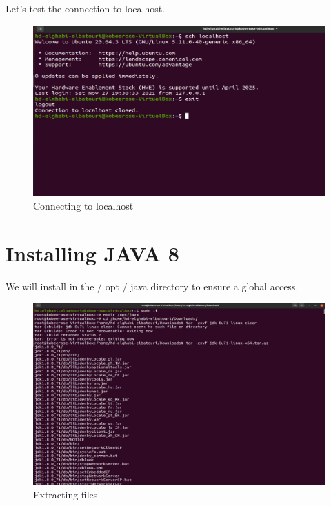 \begin{spacing}{1.2}
\par Let's test the connection to localhost.
\\
\begin{figure}[!htb] 
\begin{center} 
\includegraphics[width=1\linewidth]{Big_Data/Hadoop/Apache Hadoop Installation/Connecting to localhost} 
\end{center} 
\caption{Connecting to localhost} 
\end{figure} 
\FloatBarrier

\section{Installing JAVA 8}

\par We will install in the / opt / java directory to ensure a global access.
\\
\begin{figure}[!htb] 
\begin{center} 
\includegraphics[width=1\linewidth]{Big_Data/Hadoop/Apache Hadoop Installation/Extracting files} 
\end{center} 
\caption{Extracting files} 
\end{figure} 
\FloatBarrier


\end{spacing}
